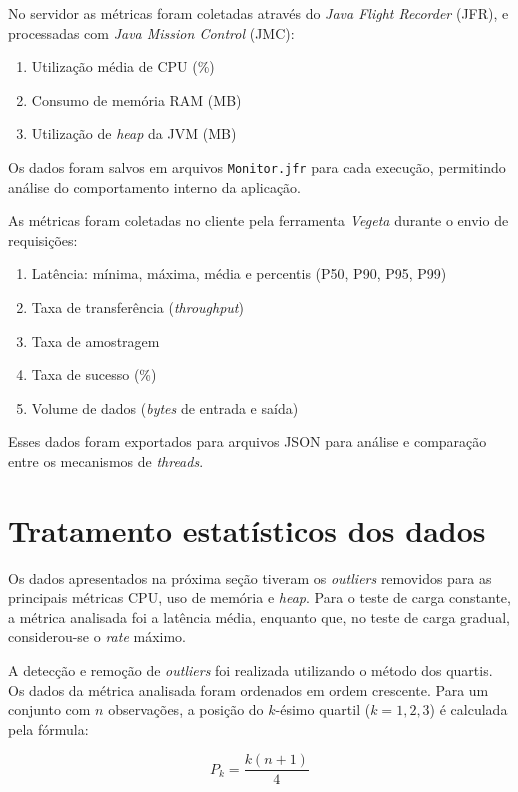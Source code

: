 \documentclass[12pt, openright, oneside, a4paper, english,	french,	spanish, brazil	]{abntex2}
\begin{document}
    No servidor as métricas foram coletadas através do \textit{Java Flight Recorder} (JFR), e processadas com \textit{Java Mission Control} (JMC):

    \begin{enumerate}
        \item Utilização média de CPU (\%)
        \item Consumo de memória RAM (MB)
        \item Utilização de \textit{heap} da JVM (MB)
    \end{enumerate}

    Os dados foram salvos em arquivos \texttt{Monitor.jfr} para cada execução, permitindo análise do comportamento interno da aplicação.

    As métricas foram coletadas no cliente pela ferramenta \textit{Vegeta} durante o envio de requisições:
    \begin{enumerate}
        \item Latência: mínima, máxima, média e percentis (P50, P90, P95, P99)
        \item Taxa de transferência (\textit{throughput})
        \item Taxa de amostragem
        \item Taxa de sucesso (\%)
        \item Volume de dados (\textit{bytes} de entrada e saída)
    \end{enumerate}

    Esses dados foram exportados para arquivos JSON para análise e comparação entre os mecanismos de \textit{threads}.

    \section{Tratamento estatísticos dos dados}

    Os dados apresentados na próxima seção tiveram os \textit{outliers} removidos para as principais métricas CPU, uso de memória e \textit{heap}. Para o teste de carga constante, a métrica analisada foi a latência média, enquanto que, no teste de carga gradual, considerou-se o \textit{rate} máximo.

    A detecção e remoção de \textit{outliers} foi realizada utilizando o método dos quartis. Os dados da métrica analisada foram ordenados em ordem crescente. Para um conjunto com $n$ observações, a posição do $k$-ésimo quartil ($k = 1, 2, 3$) é calculada pela fórmula:

    \[
    P_k = \frac{k (n+1)}{4}
    \]
\end{document}
